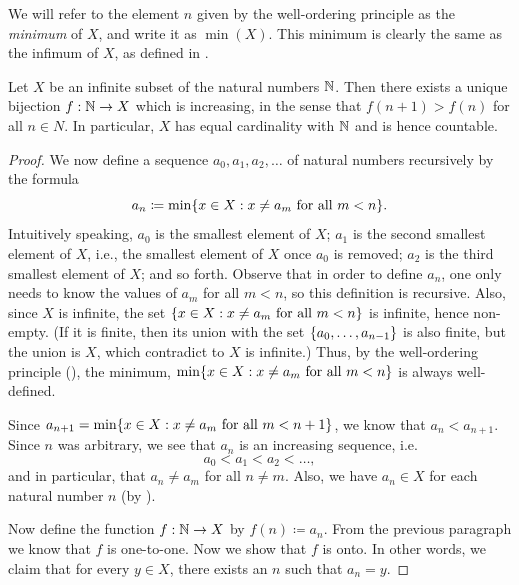 \begin{note}
  We will refer to the element \(n\) given by the well-ordering principle as the \emph{minimum} of \(X\), and write it as \(\min(X)\).
  This minimum is clearly the same as the infimum of \(X\), as defined in .
\end{note}

\begin{prop}\label{i:8.1.5}
  Let \(X\) be an infinite subset of the natural numbers \(\mathbb{N}\).
  Then there exists a unique bijection \(f : \mathbb{N} \to X\) which is increasing, in the sense that \(f(n + 1) > f(n)\) for all \(n \in N\).
  In particular, \(X\) has equal cardinality with \(\mathbb{N}\) and is hence countable.
\end{prop}

\begin{proof}
  We now define a sequence \(a_0, a_1, a_2, \dots\) of natural numbers recursively by the formula
  \[
    a_n \coloneqq \min\set{x \in X : x \neq a_m \text{ for all } m < n}.
  \]
  Intuitively speaking, \(a_0\) is the smallest element of \(X\);
  \(a_1\) is the second smallest element of \(X\), i.e., the smallest element of \(X\) once \(a_0\) is removed;
  \(a_2\) is the third smallest element of \(X\);
  and so forth.
  Observe that in order to define \(a_n\), one only needs to know the values of \(a_m\) for all \(m < n\), so this definition is recursive.
  Also, since \(X\) is infinite, the set \(\left\lbrace x \in X : x \neq a_m \text{ for all } m < n\right\rbrace\) is infinite, hence non-empty.
  (If it is finite, then its union with the set \(\left\lbrace a_0, \dots, a_{n - 1}\right\rbrace\) is also finite, but the union is \(X\), which contradict to \(X\) is infinite.)
  Thus, by the well-ordering principle (), the minimum, \(\min\set{x \in X : x \neq a_m \text{ for all } m < n}\) is always well-defined.

  Since \(a_{n + 1} = \min\set{x \in X : x \neq a_m \text{ for all } m < n + 1}\), we know that \(a_n < a_{n + 1}\).
  Since \(n\) was arbitrary, we see that \(a_n\) is an increasing sequence, i.e.
  \[
    a_0 < a_1 < a_2 < \dots,
  \]
  and in particular, that \(a_n \neq a_m\) for all \(n \neq m\).
  Also, we have \(a_n \in X\) for each natural number \(n\) (by ).

  Now define the function \(f : \mathbb{N} \to X\) by \(f(n) \coloneqq a_n\).
  From the previous paragraph we know that \(f\) is one-to-one.
  Now we show that \(f\) is onto.
  In other words, we claim that for every \(y \in X\), there exists an \(n\) such that \(a_n = y\).


\end{proof}
